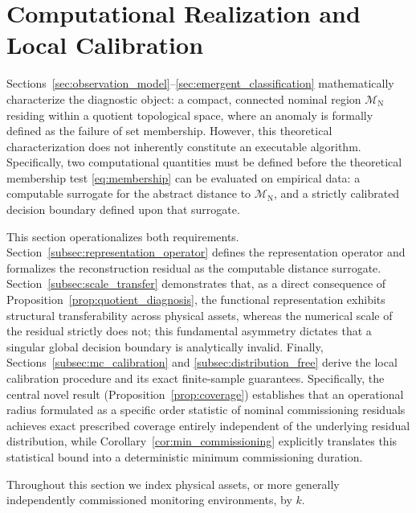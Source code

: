 \documentclass[a4paper]{cas-sc}
\newcommand{\Mnominal}{\ensuremath{\mathcal{M}_{\mathrm{N}}}}
\begin{document}
\section{Computational Realization and Local Calibration}
\label{sec:computational_realization}

Sections~\ref{sec:observation_model}--\ref{sec:emergent_classification} mathematically characterize the diagnostic object: a compact, connected nominal region \(\Mnominal\) residing within a quotient topological space, where an anomaly is formally defined as the failure of set membership. However, this theoretical characterization does not inherently constitute an executable algorithm. Specifically, two computational quantities must be defined before the theoretical membership test \eqref{eq:membership} can be evaluated on empirical data: a computable surrogate for the abstract distance to \(\Mnominal\), and a strictly calibrated decision boundary defined upon that surrogate.

This section operationalizes both requirements. Section~\ref{subsec:representation_operator} defines the representation operator and formalizes the reconstruction residual as the computable distance surrogate. Section~\ref{subsec:scale_transfer} demonstrates that, as a direct consequence of Proposition~\ref{prop:quotient_diagnosis}, the functional representation exhibits structural transferability across physical assets, whereas the numerical scale of the residual strictly does not; this fundamental asymmetry dictates that a singular global decision boundary is analytically invalid. Finally, Sections~\ref{subsec:mc_calibration} and \ref{subsec:distribution_free} derive the local calibration procedure and its exact finite-sample guarantees. Specifically, the central novel result (Proposition~\ref{prop:coverage}) establishes that an operational radius formulated as a specific order statistic of nominal commissioning residuals achieves exact prescribed coverage entirely independent of the underlying residual distribution, while Corollary~\ref{cor:min_commissioning} explicitly translates this statistical bound into a deterministic minimum commissioning duration.

Throughout this section we index physical assets, or more generally
independently commissioned monitoring environments, by \(k\).

\end{document}
